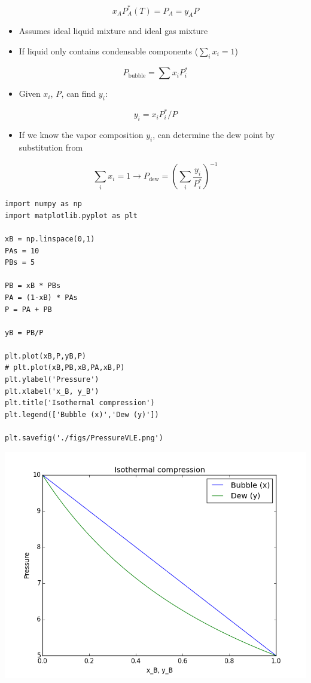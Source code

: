 \documentclass[11pt]{article}
\begin{document}
\[ x_{A} P^{*}_{A}(T) = P_{A} = y_{A} P \]

\begin{itemize}
\item Assumes ideal liquid mixture and ideal gas mixture

\item If liquid only contains condensable components (\(\sum_{i} x_{i} = 1\))
\end{itemize}

\[ P_{\text{bubble}} = \sum x_{i} P_{i}^{*} \]

\begin{itemize}
\item Given \(x_{i}\), \emph{P}, can find \(y_{i}\):
\end{itemize}

\[ y_{i} = x_{i} P_{i}^{*} / P \]

\begin{itemize}
\item If we know the vapor composition \(y_{i}\), can determine the dew point by substitution from
\end{itemize}

\[ \sum_{i} x_{i} = 1  \to P_{\text{dew}} = \left ( \sum_{i}\frac{y_{i}}{P_{i}^{*}} \right )^{-1} \]

\begin{verbatim}
import numpy as np
import matplotlib.pyplot as plt

xB = np.linspace(0,1)
PAs = 10
PBs = 5

PB = xB * PBs
PA = (1-xB) * PAs
P = PA + PB

yB = PB/P

plt.plot(xB,P,yB,P)
# plt.plot(xB,PB,xB,PA,xB,P)
plt.ylabel('Pressure')
plt.xlabel('x_B, y_B')
plt.title('Isothermal compression')
plt.legend(['Bubble (x)','Dew (y)'])

plt.savefig('./figs/PressureVLE.png')
\end{verbatim}

\includegraphics[width=.9\linewidth]{./figs/PressureVLE.png}
\end{document}
